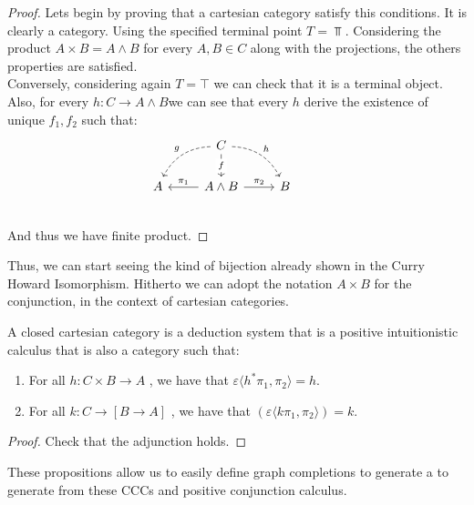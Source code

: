 \begin{proof}

  Lets begin by proving that a cartesian category satisfy this conditions. It is clearly a category. Using the specified terminal point $T=\Top$.  Considering the product $A\times B = A\land B$ for every $A,B \in C$ along with the projections, the others properties are satisfied.\\

  Conversely, considering again $T= \top$ we can check that it is a terminal object. Also, for every $h:C\to A\land B$we can see that every $h$ derive the existence of unique $f_1,f_2$ such that:
  \[
\begin{tikzcd}
{} & C \arrow[bend right,swap,dashed]{dl}{g}
\arrow[bend left,dashed]{dr}{h} \arrow{d}[description]{f}& & \\
A  &A\land B \arrow{l}[swap]{\pi_1} \arrow{r}{\pi_2} & 
B \\
\end{tikzcd}
\]
 And thus we have finite product.
\end{proof}

Thus, we can start seeing the kind of bijection already shown in the Curry Howard Isomorphism. Hitherto we can adopt the notation $A\times B$ for the conjunction, in the context of cartesian categories.
\begin{proposition}
  A closed cartesian category is a deduction system that is a positive intuitionistic calculus that is also a category such that:
  \begin{enumerate}
  \item   For all $h: C\times B \to A$ , we have that $\varepsilon \langle h^* \pi_1, \pi_2\rangle = h$.
  \item   For all $k: C\to [B \to A]$ , we have that $(\varepsilon \langle k \pi_1, \pi_2\rangle) = k$.
  \end{enumerate}
\end{proposition}

\begin{proof}
Check that the adjunction holds.
\end{proof}

These propositions allow us to easily define graph completions to generate a to generate from these CCCs and positive conjunction calculus.



